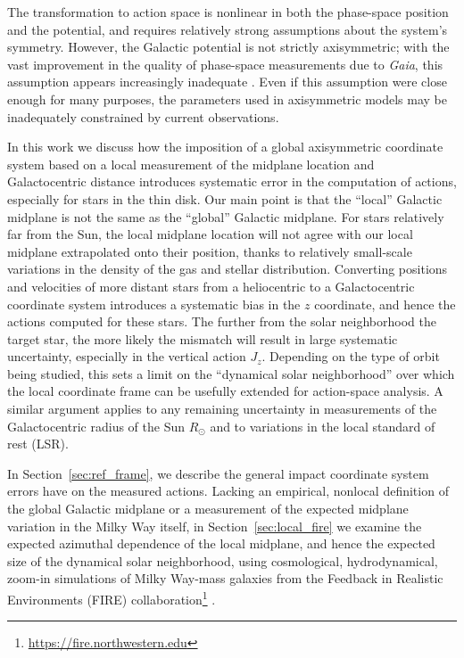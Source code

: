 \documentclass[twocolumn]{aastex62}
\begin{document}
The transformation to action space is nonlinear in both the phase-space
position and the potential, and requires relatively strong assumptions about
the system's symmetry. 
    However, 
the Galactic potential is not strictly
axisymmetric; with the vast improvement in the quality of phase-space
measurements due to {\em Gaia}, this assumption appears increasingly
inadequate \citep[e.g.][]{2018Natur.561..360A}. Even if this
assumption 
     were
close enough for many purposes, the parameters used in axisymmetric models may
be inadequately constrained by current observations.

In this work we discuss how the imposition of a global axisymmetric coordinate
system based on a local measurement of the midplane location and
Galactocentric distance introduces systematic error in the computation of
actions, especially for stars in the thin disk. Our main point is that the
``local'' Galactic midplane is not the same as the ``global'' Galactic
midplane. For stars relatively far from the Sun, the local midplane location
will not agree with our local midplane extrapolated onto their position,
thanks to relatively small-scale variations in the density of the gas and
stellar distribution. Converting positions and velocities of more distant
stars from a heliocentric to a Galactocentric coordinate system introduces a
systematic bias in the $z$ coordinate, and hence the actions computed for
these stars. The further from the solar neighborhood the target star, the more
likely the mismatch will result in large systematic uncertainty, especially in
the vertical action $J_z$. Depending on the type of orbit being studied, this
sets a limit on the ``dynamical solar neighborhood'' over which the local
coordinate frame can be usefully extended for action-space analysis. A similar
argument applies to 
   any remaining 
uncertainty in measurements of 
     the Galactocentric radius of the Sun $R_{\odot}$
and to variations in the local standard of rest (LSR).

In Section~\ref{sec:ref_frame}, we describe the general impact coordinate
system errors have on the measured actions. Lacking an empirical, nonlocal
definition of the global Galactic midplane or a measurement of the expected
midplane variation in the Milky Way itself,  in Section~\ref{sec:local_fire}
we 
    examine the expected 
azimuthal dependence of the local midplane, and
hence the expected size of the dynamical solar neighborhood, using
cosmological, hydrodynamical, zoom-in simulations of Milky Way-mass galaxies
from the Feedback in Realistic Environments (FIRE)
collaboration\footnote{\url{https://fire.northwestern.edu}}
\citep{2016ApJ...827L..23W,2017arXiv170206148H}.
\end{document}
